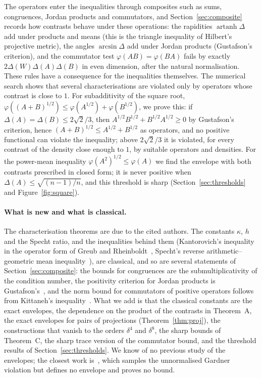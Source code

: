 \documentclass[11pt]{article}
\theoremstyle{plain}
\theoremstyle{definition}
\theoremstyle{remark}
\begin{document}
The operators enter the inequalities through composites such as sums, congruences, Jordan products and commutators,
and Section~\ref{sec:composite} records how contrasts behave under these operations: the rapidities
$\operatorname{artanh}\Delta$ add under products and means (this is the triangle inequality of Hilbert's projective
metric), the angles $\arcsin\Delta$ add under Jordan products (Gustafson's criterion), and the commutator test
$\varphi(AB)=\varphi(BA)$ fails by exactly $2\Delta(W)\Delta(A)\Delta(B)$ in even dimension, after the natural
normalisation. These rules have a consequence for the inequalities themselves. The numerical search shows that
several characterisations are violated only by operators whose contrast is close to $1$. For subadditivity of the
square root, $\varphi((A+B)^{1/2})\le\varphi(A^{1/2})+\varphi(B^{1/2})$, we prove this: if $\Delta(A)=\Delta(B)\le2\sqrt2/3$,
then $A^{1/2}B^{1/2}+B^{1/2}A^{1/2}\ge0$ by Gustafson's criterion, hence $(A+B)^{1/2}\le A^{1/2}+B^{1/2}$ as operators, and
no positive functional can violate the inequality; above $2\sqrt2/3$ it is violated, for every contrast of the density
close enough to $1$, by suitable operators and densities. For the power-mean inequality $\varphi(A^2)^{1/2}\le\varphi(A)$ we
find the envelope with both contrasts prescribed in closed form; it is never positive when $\Delta(A)\le\sqrt{(n-1)/n}$,
and this threshold is sharp (Section~\ref{sec:thresholds} and Figure~\ref{fig:square}).

\paragraph{What is new and what is classical.} The characterisation theorems are due to the cited authors. The
constants $\kappa$, $h$ and the Specht ratio, and the inequalities behind them (Kantorovich's inequality in the operator
form of Greub and Rheinboldt~\cite{greub1959}, Specht's reverse arithmetic--geometric mean
inequality~\cite{specht1960}), are classical, and so are several statements of Section~\ref{sec:composite}: the bounds
for congruences are the submultiplicativity of the condition number, the positivity criterion for Jordan products is
Gustafson's~\cite{gustafson1968}, and the norm bound for commutators of positive operators follows from Kittaneh's
inequality~\cite{kittaneh2008}. What we add is that the classical constants are the exact envelopes, the dependence on the
product of the contrasts in Theorem~A, the exact envelopes for pairs of projections (Theorem~\ref{thm:proj}), the
constructions that vanish to the orders $\delta^4$ and $\delta^8$, the sharp bounds of Theorem~C, the sharp trace
version of the commutator bound, and the threshold results of Section~\ref{sec:thresholds}. We know of no previous study
of the envelopes; the closest work is~\cite{abed2024}, which samples the unnormalised Gardner violation but defines no
envelope and proves no bound.
\end{document}
